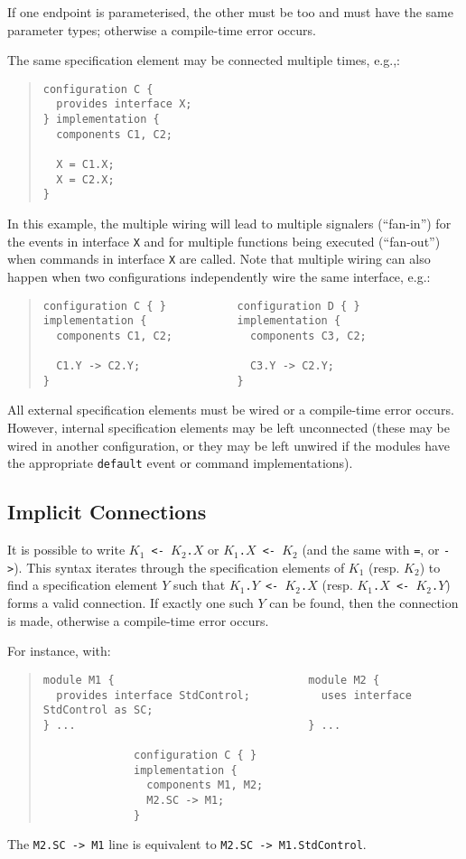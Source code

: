 \documentclass[11pt,letterpaper]{article}
\newcommand{\kw}[1]{{\tt #1}}
\newcommand{\code}[1]{{\tt #1}}
\begin{document}
If one endpoint is parameterised, the other must be too and must have the
same parameter types; otherwise a compile-time error occurs.

The same specification element may be connected multiple times, e.g.,:
\begin{quote} \begin{verbatim}
configuration C {
  provides interface X;
} implementation {
  components C1, C2;

  X = C1.X;
  X = C2.X;
}
\end{verbatim} \end{quote}
In this example, the multiple wiring will lead to multiple signalers
(``fan-in'') for the events in interface \code{X} and for multiple
functions being executed (``fan-out'') when commands in interface \code{X}
are called. Note that multiple wiring can also happen when two
configurations independently wire the same interface, e.g.:
\begin{quote} \begin{verbatim}
configuration C { }           configuration D { }
implementation {              implementation {
  components C1, C2;            components C3, C2;

  C1.Y -> C2.Y;                 C3.Y -> C2.Y;
}                             }
\end{verbatim} \end{quote}

All external specification elements must be wired or a compile-time error
occurs. However, internal specification elements may be left unconnected
(these may be wired in another configuration, or they may be left unwired
if the modules have the appropriate \kw{default} event or command
implementations).

\subsection{Implicit Connections}
\label{sec:implicit}

It is possible to write \code{$K_1$ <- $K_2$.$X$} or \code{$K_1$.$X$ <-
$K_2$} (and the same with \kw{=}, or \kw{->}). This syntax iterates through
the specification elements of $K_1$ (resp. $K_2$) to find a specification
element $Y$ such that \code{$K_1$.$Y$ <- $K_2$.$X$} (resp. \code{$K_1$.$X$
<- $K_2$.$Y$}) forms a valid connection. If exactly one such $Y$ can
be found, then the connection is made, otherwise a compile-time error
occurs.

For instance, with:
\begin{quote} \begin{verbatim}
module M1 {                              module M2 {
  provides interface StdControl;           uses interface StdControl as SC;
} ...                                    } ...

              configuration C { }
              implementation {
                components M1, M2;
                M2.SC -> M1;
              }
\end{verbatim} \end{quote}
The \code{M2.SC -> M1} line is equivalent to \code{M2.SC -> M1.StdControl}.
\end{document}
